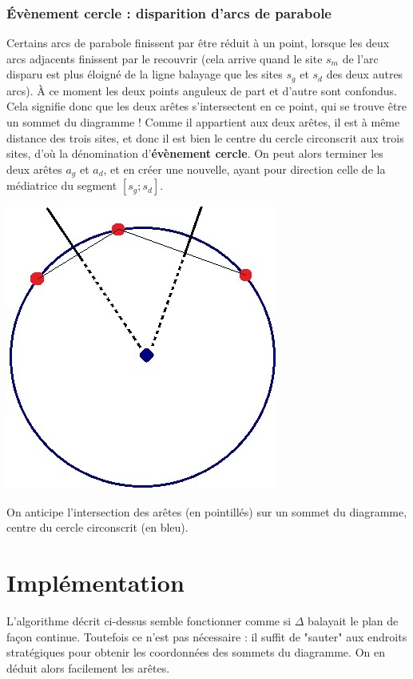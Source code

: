 \documentclass[a4paper, 10pt]{article}
\begin{document}
\subsubsection{Évènement cercle : disparition d'arcs de parabole}  
  
Certains arcs de parabole finissent par être réduit à un point, lorsque les deux arcs adjacents finissent par le recouvrir (cela arrive quand le site $s_m$ de l'arc disparu est plus éloigné de la ligne balayage que les sites $s_g$ et $s_d$ des deux autres arcs). À ce moment les deux points anguleux de part et d'autre sont confondus. Cela signifie donc que les deux arêtes s'intersectent en ce point, qui se trouve être un sommet du diagramme ! Comme il appartient aux deux arêtes, il est à même distance des trois sites, et donc il est bien le centre du cercle circonscrit aux trois sites, d'où la dénomination d'\textbf{évènement cercle}. On peut alors terminer les deux arêtes $a_g$ et $a_d$, et en créer une nouvelle, ayant pour direction celle de la médiatrice du segment $[s_g;s_d]$.  
  
\begin{center}
\includegraphics[scale=0.35]{EvenementCercle.jpg}  
  
On anticipe l'intersection des arêtes (en pointillés) sur un sommet du diagramme, centre du cercle circonscrit (en bleu). 
\end{center}
  
\section{Implémentation}  
L'algorithme décrit ci-dessus semble fonctionner comme si $\Delta$ balayait le plan de façon continue. Toutefois ce n'est pas nécessaire : il suffit de "sauter" aux endroits stratégiques pour obtenir les coordonnées des sommets du diagramme. On en déduit alors facilement les arêtes.  
  
\end{document}
